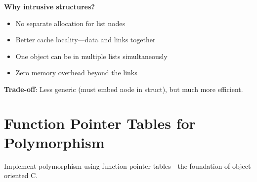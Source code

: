 \textbf{Why intrusive structures?}
\begin{itemize}
    \item No separate allocation for list nodes
    \item Better cache locality---data and links together
    \item One object can be in multiple lists simultaneously
    \item Zero memory overhead beyond the links
\end{itemize}

\textbf{Trade-off}: Less generic (must embed node in struct), but much more efficient.

\section{Function Pointer Tables for Polymorphism}

Implement polymorphism using function pointer tables---the foundation of object-oriented C.

